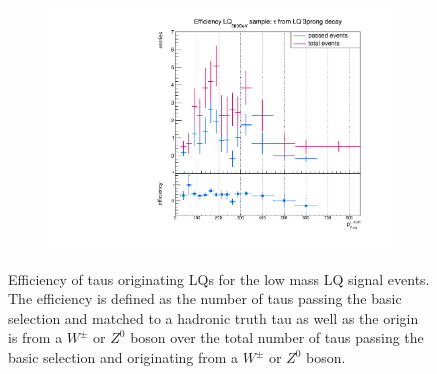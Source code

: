 \begin{figure}
\begin{subfigure}[t]{0.49\textwidth}
                \label{DividedfromLQ:signal:1prongLQ75}
                \end{subfigure}
                \begin{subfigure}[t]{0.49\textwidth}
                \includegraphics[width=\textwidth]{figures/plots/LQ75/Divided_fromLQ3prong.pdf}
                \label{DividedfromLQ:signal:3prong}
                \end{subfigure}
\caption[Efficiency of taus originating LQs for the low mass LQ signal events.]{Efficiency of taus originating LQs for the low mass LQ signal events. The efficiency is defined as the number of taus passing the basic selection and matched to a hadronic truth tau as well as the origin is from a $W^\pm$ or $Z^0$ boson over the total number of taus passing the basic selection and originating from a $W^\pm$ or $Z^0$ boson.}
\label{DividedFromLQ:signal:LQ75}
\end{figure}
%
%
